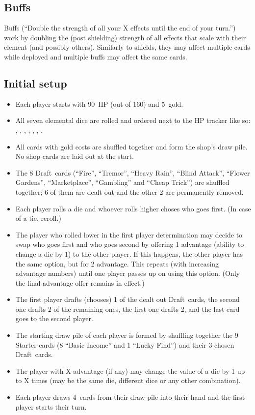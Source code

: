 \documentclass[dvipsnames,parskip,a4paper]{scrartcl}
\newcommand{\iconsize}{3.4mm}
\newcommand{\icondepth}{0.45mm}
\newcommand{\icon}[1]{\raisebox{-\icondepth}{\texttt{[image:  \#1 ]}}}
\newcommand{\fire}{\icon{icons/fire.png}}
\newcommand{\earth}{\icon{icons/earth.png}}
\newcommand{\water}{\icon{icons/water.png}}
\newcommand{\nature}{\icon{icons/nature.png}}
\newcommand{\magic}{\icon{icons/magic.png}}
\newcommand{\gold}{\icon{icons/gold.png}}
\newcommand{\chance}{\icon{icons/chance.png}}
\newcommand{\draft}{Draft}
\newcommand{\startgold}{5}
\newcommand{\handsize}{4}
\newcommand{\starthp}{90}
\newcommand{\maxhp}{160}
\begin{document}
\subsection*{Buffs}

Buffs (``Double the strength of all your X effects until the end of your turn.'') work by doubling the (post shielding) strength of all effects that scale with their element (and possibly others). Similarly to shields, they may affect multiple cards while deployed and multiple buffs may affect the same cards.

\newpage

\subsection*{Initial setup}

\begin{itemize}
\item Each player starts with \starthp \ HP (out of \maxhp) and \startgold \ gold.
\item All seven elemental dice are rolled and ordered next to the HP tracker like so: \fire, \earth, \water, \nature, \gold, \magic, \chance.
\item All cards with gold costs are shuffled together and form the shop's draw pile. No shop cards are laid out at the start.
\item The 8 \draft \ cards (``Fire'', ``Tremor'', ``Heavy Rain'', ``Blind Attack'', ``Flower Gardens'', ``Marketplace'', ``Gambling'' and ``Cheap Trick'') are shuffled together; 6 of them are dealt out and the other 2 are permanently removed.
\item Each player rolls a die and whoever rolls higher choses who goes first. (In case of a tie, reroll.)
\item The player who rolled lower in the first player determination may decide to swap who goes first and who goes second by offering 1 advantage (ability to change a die by 1) to the other player. If this happens, the other player has the same option, but for 2 advantage. This repeats (with increasing advantage numbers) until one player passes up on using this option. (Only the final advantage offer remains in effect.)
\item The first player drafts (chooses) 1 of the dealt out \draft \ cards, the second one drafts 2 of the remaining ones, the first one drafts 2, and the last card goes to the second player.
\item The starting draw pile of each player is formed by shuffling together the 9 Starter cards (8 ``Basic Income'' and 1 ``Lucky Find'') and their 3 chosen \draft \ cards.
\item The player with X advantage (if any) may change the value of a die by 1 up to X times (may be the same die, different dice or any other combination).
\item Each player draws \handsize \ cards from their draw pile into their hand and the first player starts their turn.
\end{itemize}
\end{document}
